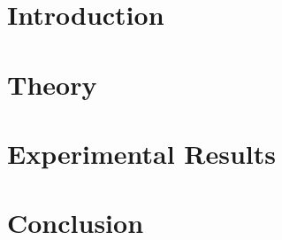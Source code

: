 
\addtolength{\evensidemargin}{-12mm}

\part[Introduction]{Introduction}
\label{part:introduction}



\part[Theory]{Theory}
\label{part:theoretical_background}




\part[Experimental Results]{Experimental Results}
\label{part:experiments}



\part[Conclusion]{Conclusion}
\label{part:conclusion}

